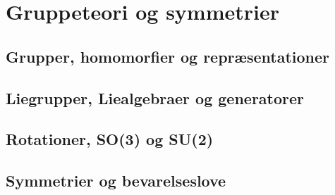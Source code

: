 \chapter{Gruppeteori og symmetrier}
\section{Grupper, homomorfier og repræsentationer}
\leavevmode\par

\section{Liegrupper, Liealgebraer og generatorer}
\leavevmode\par

\section{Rotationer, SO(3) og SU(2)}
\leavevmode\par

\section{Symmetrier og bevarelseslove}
\leavevmode\par

